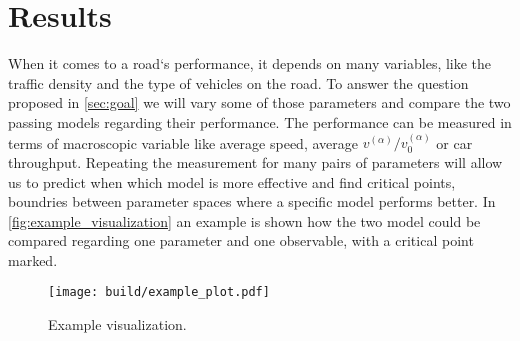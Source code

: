 \section{Results}
\label{sec:results}
When it comes to a road`s performance, it depends on many variables, like the traffic density and the type of vehicles
on the road. To answer the question proposed in \autoref{sec:goal} we will vary some of those parameters and 
compare the two
passing models regarding their performance. The performance can be measured in terms of macroscopic variable like
average speed, average $v^{(\alpha)}/v_0^{(\alpha)}$ or car throughput. 
Repeating the measurement for many pairs of parameters will allow us to predict when which model is more effective and 
find critical points, boundries between parameter spaces where a specific model performs better. In
\autoref{fig:example_visualization} an example is shown how the two model could be compared regarding one parameter and
one observable, with a critical point marked.
\begin{figure}[H]
	\centering
	\texttt{[image: build/example\_plot.pdf]}
	\caption{Example visualization.}
	\label{fig:example_visualization}
\end{figure}

